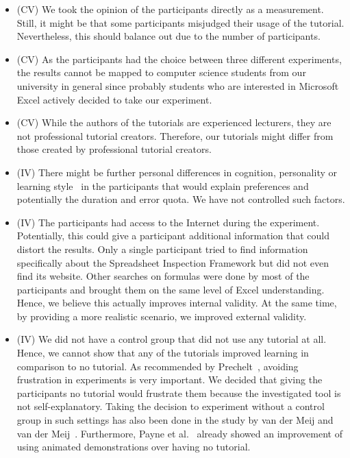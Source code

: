 \begin{itemize}
\item (CV) We took the opinion of the participants directly as a measurement. Still, it might be that some participants misjudged their usage of the tutorial. Nevertheless, this should balance out due to the number of participants. 
\item (CV) As the participants had the choice between three different experiments, the results cannot be mapped to computer science students from our university in general since probably students who are interested in Microsoft Excel actively decided to take our experiment.
\item (CV) While the authors of the tutorials are experienced lecturers, they are not professional tutorial creators. Therefore, our tutorials might differ from those created by professional tutorial creators. 

\item (IV) There might be further personal differences in cognition, personality or learning style~\cite{mestre} in the participants that would explain 
preferences and potentially the duration and error quota. We have not controlled such factors.

\item (IV) The participants had access to the Internet during the experiment. Potentially, this could give a participant additional information that could
distort the results. Only a single participant tried to find information specifically about the Spreadsheet Inspection Framework but did not even find its website.
Other searches on formulas were done by most of the participants and brought them on the same level of Excel understanding. Hence, we believe this
actually improves internal validity. At the same time, by providing a more realistic scenario, we improved external validity. 

\item (IV) We did not have a control group that did not use any tutorial at all. Hence, we cannot show that any of the tutorials improved learning in
comparison to no tutorial. As recommended by Prechelt~\cite{prechelt}, avoiding frustration in experiments is very important. We decided that giving the participants no tutorial would frustrate them because the investigated tool is not self-explanatory.  Taking the decision to experiment without a control group in such settings has also been done in the study by van der Meij and van der Meij~\cite{vanderMeij}. Furthermore, Payne et al.~\cite{payne} already showed an improvement of using animated demonstrations over having no tutorial.


\end{itemize}
